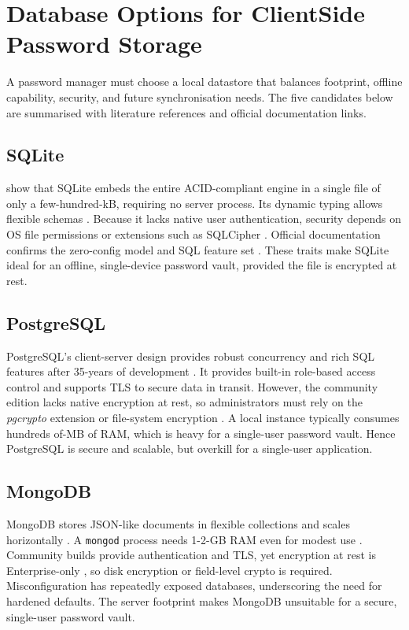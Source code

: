 \clearpage


\section{Database Options for Client\textendash Side Password Storage}

A password manager must choose a local datastore that balances footprint,
offline capability, security, and future synchronisation needs.  The five
candidates below are summarised with literature references and official
documentation links.

\subsection*{SQLite}
\textcite{Gaffney2022} show that SQLite embeds the entire ACID-compliant
engine in a single file of only a few-hundred-kB, requiring no server
process.  Its dynamic typing allows flexible schemas \autocite{Corovcak2025}.
Because it lacks native user authentication, security depends on OS file
permissions or extensions such as SQLCipher \autocite{Corovcak2025}.
Official documentation confirms the zero-config model and SQL feature set
\autocite{sqlLiteDoc2025}. These traits make SQLite ideal for an offline,
single-device password vault, provided the file is encrypted at rest.

\subsection*{PostgreSQL}
PostgreSQL's client-server design provides robust concurrency and rich SQL
features after 35-years of development \autocite{Gkamas2022}. It provides 
built-in role-based access control and supports TLS to secure data in transit.
However, the community edition lacks native encryption at rest, so administrators 
must rely on the \textit{pgcrypto} extension or file-system encryption 
\autocite{Crunchy2024, PostgreSQL2025}. A local instance typically consumes hundreds of-MB of RAM,
which is heavy for a single-user password vault. Hence PostgreSQL is secure and scalable,
but overkill for a single-user application.

\subsection*{MongoDB}
MongoDB stores JSON-like documents in flexible collections and scales
horizontally \autocite{Miryala2024}.  A \texttt{mongod} process needs 1-2-GB
RAM even for modest use \autocite{Dahunsi2021}.  Community builds provide
authentication and TLS, yet encryption at rest is Enterprise-only
\autocite{PrismaMongoEnc, MongoDB2025}, so disk encryption or field-level
crypto is required.  Misconfiguration has repeatedly exposed databases,
underscoring the need for hardened defaults.  The
server footprint makes MongoDB unsuitable for a secure, single-user password vault.

